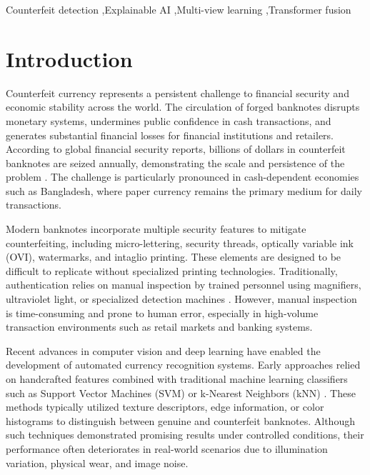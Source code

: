 \documentclass[preprint,12pt,authoryear]{elsarticle}
\begin{document}
\begin{frontmatter}
\begin{abstract}
The proposed framework provides a trustworthy and deployable AI solution for banknote authentication and establishes a strong foundation for future research on explainable financial security systems in emerging economies.

\end{abstract}

\begin{keyword}
Counterfeit detection \sep Explainable AI \sep Multi-view learning \sep Transformer fusion
\end{keyword}

\end{frontmatter}

\section{Introduction}

Counterfeit currency represents a persistent challenge to financial security and economic stability across the world. The circulation of forged banknotes disrupts monetary systems, undermines public confidence in cash transactions, and generates substantial financial losses for financial institutions and retailers. According to global financial security reports, billions of dollars in counterfeit banknotes are seized annually, demonstrating the scale and persistence of the problem \cite{bagnall2016consumer}. The challenge is particularly pronounced in cash-dependent economies such as Bangladesh, where paper currency remains the primary medium for daily transactions.

Modern banknotes incorporate multiple security features to mitigate counterfeiting, including micro-lettering, security threads, optically variable ink (OVI), watermarks, and intaglio printing. These elements are designed to be difficult to replicate without specialized printing technologies. Traditionally, authentication relies on manual inspection by trained personnel using magnifiers, ultraviolet light, or specialized detection machines \cite{de2003security}. However, manual inspection is time-consuming and prone to human error, especially in high-volume transaction environments such as retail markets and banking systems.

Recent advances in computer vision and deep learning have enabled the development of automated currency recognition systems. Early approaches relied on handcrafted features combined with traditional machine learning classifiers such as Support Vector Machines (SVM) or k-Nearest Neighbors (kNN) \cite{bay2006surf}. These methods typically utilized texture descriptors, edge information, or color histograms to distinguish between genuine and counterfeit banknotes. Although such techniques demonstrated promising results under controlled conditions, their performance often deteriorates in real-world scenarios due to illumination variation, physical wear, and image noise.
\end{document}
